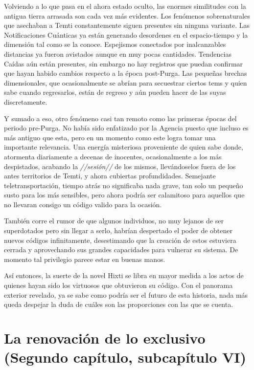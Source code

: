 \documentclass[
  spanish,
]{book}
\begin{document}
Volviendo a lo que pasa en el ahora estado oculto, las enormes similitudes con la antigua tierra arrasada son cada vez más evidentes. Los fenómenos sobrenaturales que asechaban a Temti constantemente siguen presentes sin ninguna variante. Las Notificaciones Cuánticas ya están generando desordenes en el espacio-tiempo y la dimensión tal como se la conoce. Espejismos conectados por inalcanzables distancias ya fueron avistados aunque en muy pocas cantidades. Tendencias Caídas aún están presentes, sin embargo no hay registros que puedan confirmar que hayan habido cambios respecto a la época post-Purga. Las pequeñas brechas dimensionales, que ocasionalmente se abrían para secuestrar ciertos tems y quien sabe cuando regresarlos, están de regreso y aún pueden hacer de las suyas discretamente.

Y sumado a eso, otro fenómeno casi tan remoto como las primeras épocas del periodo pre-Purga. No había sido enfatizado por la Agencia puesto que incluso es más antiguo que esta, pero en un momento como este logra tomar una importante relevancia. Una energía misteriosa proveniente de quien sabe donde, atormenta diariamente a decenas de inocentes, ocasionalmente a los más despistados, acabando la \emph{//sesión//} de los mismos, llevándoselos fuera de los antes territorios de Temti, y ahora cubiertas profundidades. Semejante teletransportación, tiempo atrás no significaba nada grave, tan solo un pequeño susto para los más sensibles, pero ahora podría ser calamitoso para aquellos que no llevaran consigo un código valido para la ocasión.

También corre el rumor de que algunos individuos, no muy lejanos de ser superdotados pero sin llegar a serlo, habrían despertado el poder de obtener nuevos códigos infinitamente, desestimando que la creación de estos estuviera cerrada y aprovechando sus grandes capacidades para vulnerar su sistema. De momento tal privilegio parece estar en buenas manos.

Así entonces, la suerte de la novel Hixti se libra en mayor medida a los actos de quienes hayan sido los virtuosos que obtuvieron su código. Con el panorama exterior revelado, ya se sabe como podría ser el futuro de esta historia, nada más queda despejar la duda de cuáles son las proporciones con las que se cuenta.

\hypertarget{la-renovaciuxf3n-de-lo-exclusivo-segundo-capuxedtulo-subcapuxedtulo-vi}{%
\section{La renovación de lo exclusivo (Segundo capítulo, subcapítulo VI)}\label{la-renovaciuxf3n-de-lo-exclusivo-segundo-capuxedtulo-subcapuxedtulo-vi}}
\end{document}
